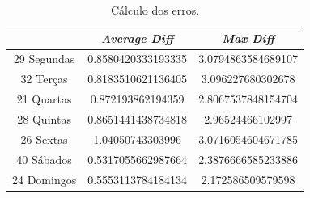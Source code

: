 \documentclass[a4paper, 12pt]{article}
\begin{document}
\begin{table}[H]
	\centering
	\begin{tabular}{||c||c|c||}
		\hline\hline
		& \textit{Average Diff} & \textit{Max Diff} \\
		\hline\hline
		29 Segundas & 
0.8580420333193335
 & 3.0794863584689107\\
		\hline
		32 Terças  &
0.8183510621136405& 3.096227680302678  \\
		\hline
		21 Quartas & 0.872193862194359
 & 2.8067537848154704 \\
		\hline
		28 Quintas  & 
0.8651441438734818
 & 2.96524466102997\\
		\hline
		26 Sextas & 1.04050743303996 & 3.0716054604671785 \\
		\hline
		40 Sábados  & 0.5317055662987664&2.3876666585233886  \\
		\hline
		24 Domingos & 0.5553113784184134
 & 2.172586509579598
 \\
		\hline\hline
	\end{tabular}
	\label{table:no_inc}
	\caption{Cálculo dos erros.}
\end{table}
\end{document}
